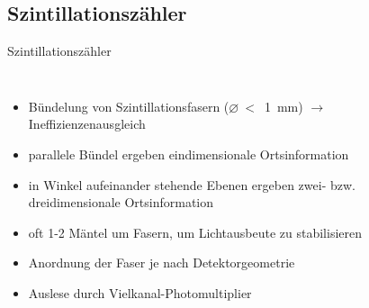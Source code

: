 
	
\subsection[]{Szintillationszähler}



\begin{frame}{Szintillationszähler}
	\begin{columns}[T]
			\begin{itemize}
			  \item Bündelung von Szintillationsfasern ($\varnothing~<$~1~mm) $\rightarrow$
			  Ineffizienzenausgleich
			  \item parallele Bündel ergeben eindimensionale Ortsinformation
			  \item in Winkel aufeinander stehende Ebenen ergeben zwei- bzw. dreidimensionale Ortsinformation
			  \item oft 1-2 Mäntel um Fasern, um Lichtausbeute zu stabilisieren
			  \item Anordnung der Faser je nach Detektorgeometrie
			  \item Auslese durch Vielkanal-Photomultiplier
			\end{itemize}	
	    	\begin{figure}[htbp]
			  \centering
			  
			\end{figure}
    \end{columns}
\end{frame}	

